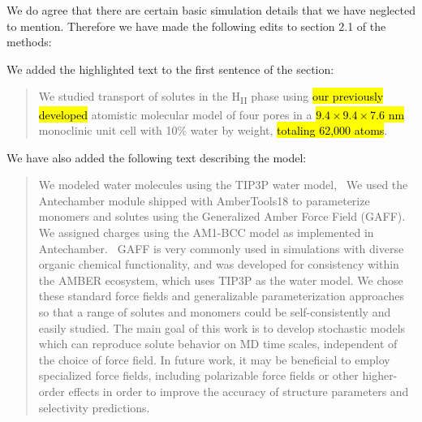 \documentclass{article}
\begin{document}
\begin{enumerate}[label={Comment \theenumi :}, leftmargin=3.9\parindent]
    We do agree that there are certain basic simulation details that we have neglected to 
    mention. Therefore we have made the following edits to section 2.1 of the methods:
    
    We added the highlighted text to the first sentence of the section:
    \begin{quote}
      We studied transport of solutes in the H\textsubscript{II} phase using \hl{our
      previously developed} atomistic molecular model of four pores in a 
      \hl{$9.4\times9.4\times7.6$ nm} monoclinic unit cell with 10\% water by weight, 
      \hl{totaling 62,000 atoms}.    
    \end{quote}
    
    We have also added the following text describing the model:
    \begin{quote}
    We modeled water molecules using the TIP3P water model,~\cite{jorgensen_comparison_1983}
    We used the Antechamber module shipped with AmberTools18 to parameterize monomers and 
    solutes using the Generalized Amber Force Field (GAFF).~\cite{wang_development_2004} We 
    assigned charges using the AM1-BCC model as implemented in Antechamber.~\cite{jakalian_fast_2000,jakalian_fast_2002}
    GAFF is very commonly used in simulations with diverse organic chemical functionality, 
    and was developed for consistency within the AMBER ecosystem, which uses TIP3P as the
    water model. We chose these standard force fields and generalizable parameterization 
    approaches so that a range of solutes and monomers could be self-consistently and easily 
    studied. The main goal of this work is to develop stochastic models which can reproduce
    solute behavior on MD time scales, independent of the choice of force field. In future 
    work, it may be beneficial to employ specialized force fields, including polarizable 
    force fields or other higher-order effects in order to improve the accuracy of structure 
    parameters and selectivity predictions.
    \end{quote}
    

\end{enumerate}
\end{document}
